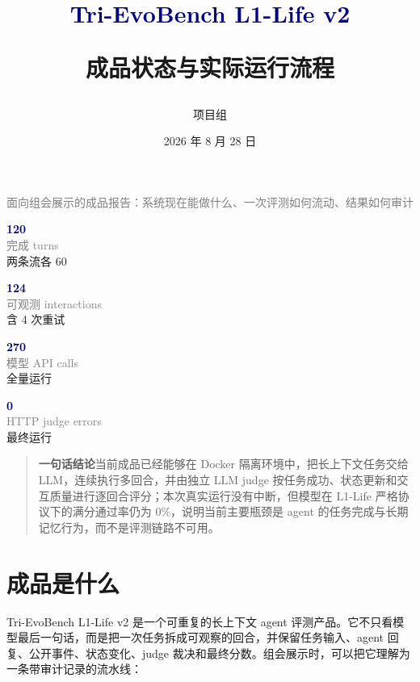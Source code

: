 \documentclass[11pt,a4paper]{article}
\title{\vspace{-1.5cm}\textcolor{navy}{Tri-EvoBench L1-Life v2}\par\vspace{4pt}\Large 成品状态与实际运行流程}
\author{项目组}
\date{2026 年 8 月 28 日}
\newcommand{\metric}[3]{\begin{minipage}[t]{0.22\linewidth}\centering\textcolor{navy}{\Large\bfseries #1}\\[-1pt]{\small\textcolor{gray}{#2}}\\[-1pt]{\scriptsize #3}\end{minipage}}
\newenvironment{evidence}{\begin{quote}\small\color{navy}}{\end{quote}}
\begin{document}
\maketitle
\thispagestyle{empty}

\begin{center}
\vspace{3pt}
\textcolor{gray}{面向组会展示的成品报告：系统现在能做什么、一次评测如何流动、结果如何审计}
\end{center}

\vspace{8pt}
\begin{center}
\metric{120}{完成 turns}{两条流各 60}
\hfill\metric{124}{可观测 interactions}{含 4 次重试}
\hfill\metric{270}{模型 API calls}{全量运行}
\hfill\metric{0}{HTTP judge errors}{最终运行}
\end{center}

\vspace{10pt}
\begin{evidence}
\textbf{一句话结论}\quad 当前成品已经能够在 Docker 隔离环境中，把长上下文任务交给 LLM，连续执行多回合，并由独立 LLM judge 按任务成功、状态更新和交互质量进行逐回合评分；本次真实运行没有中断，但模型在 L1-Life 严格协议下的满分通过率仍为 0\%，说明当前主要瓶颈是 agent 的任务完成与长期记忆行为，而不是评测链路不可用。
\end{evidence}

\section{成品是什么}

Tri-EvoBench L1-Life v2 是一个可重复的长上下文 agent 评测产品。它不只看模型最后一句话，而是把一次任务拆成可观察的回合，并保留任务输入、agent 回复、公开事件、状态变化、judge 裁决和最终分数。组会展示时，可以把它理解为一条带审计记录的流水线：
\end{document}
